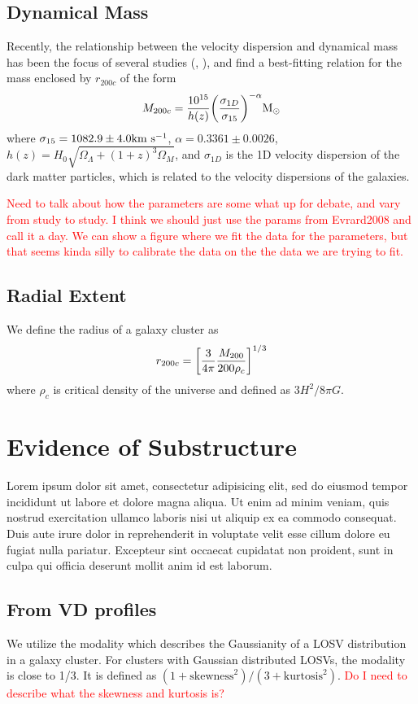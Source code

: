 \documentclass[apj, revtex4]{emulateapj}
\newcommand{\editorial}[1]{\textcolor{red}{#1} }
\begin{document}
\subsection{Dynamical Mass}
Recently, the relationship between the velocity dispersion and dynamical mass has been the focus of several studies (\eg, \citealt{Evrard2008, Saro2013, Sifon2013, VanderBurg2014}), and find a best-fitting relation for the mass enclosed by $r_{200c}$ of the form
\begin{equation}
	M_{200c} = \frac{10^{15}}{h(z)} \bigg{(}\frac{\sigma_{1D}}{\sigma_{15}} \bigg{)}^{-\alpha} \hbox{$\mathrm{M}_\odot$}
\end{equation}
where $\sigma_{15} = 1082.9 \pm 4.0 \hbox{km~s$^{-1}$}$, $\alpha = 0.3361 \pm 0.0026$, $h(z) = H_0 \sqrt{\Omega_\Lambda + (1+z)^3\Omega_M}$, and $\sigma_{1D}$ is the 1D velocity dispersion of the dark matter particles, which is related to the velocity dispersions of the galaxies. 

\editorial{Need to talk about how the parameters are some what up for debate, and vary from study to study. I think we should just use the params from Evrard2008 and call it a day. We can show a figure where we fit the data for the parameters, but that seems kinda silly to calibrate the data on the the data we are trying to fit.}

\subsection{Radial Extent}
We define the radius of a galaxy cluster as
\begin{equation}
	r_{200c} = \bigg{[} \frac{3}{4\pi} \frac{M_{200}}{200\rho_c} \bigg{]}^{1/3}
\end{equation}
where $\rho_c$ is critical density of the universe and defined as $3H^2/8\pi G$.


\section{Evidence of Substructure}
Lorem ipsum dolor sit amet, consectetur adipisicing elit, sed do eiusmod tempor incididunt ut labore et dolore magna aliqua. Ut enim ad minim veniam, quis nostrud exercitation ullamco laboris nisi ut aliquip ex ea commodo consequat. Duis aute irure dolor in reprehenderit in voluptate velit esse cillum dolore eu fugiat nulla pariatur. Excepteur sint occaecat cupidatat non proident, sunt in culpa qui officia deserunt mollit anim id est laborum.

\subsection{From VD profiles}
We utilize the modality \citep{Oliva-Altamirano2014} which describes the Gaussianity of a LOSV distribution in a galaxy cluster. For clusters with Gaussian distributed LOSVs, the modality is close to 1/3. It is defined as $(1+\mathrm{skewness}^2)/(3+\mathrm{kurtosis}^2)$. \editorial{Do I need to describe what the skewness and kurtosis is?}
\end{document}
